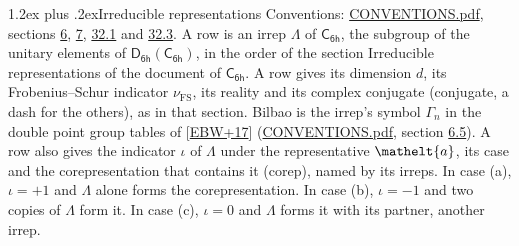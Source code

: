 \documentclass[10pt,a4paper]{article}
\makeatletter
\renewcommand\section{\@startsection{section}{1}{\z@}{-3ex plus -1ex minus -.2ex}%
  {1.2ex plus .2ex}{\normalfont\large\sffamily\bfseries\color{parttitle}}}
\numberwithin{equation}{section}
\newcommand{\eltfont}[1]{{\let\sigma\eltsigma\mathelt{#1}}}
\newcommand{\grp}[1]{\mathsf{#1}}
\newcommand{\elt}[1]{\eltfont{#1}}
\newcommand{\fsind}{\nu_{\mathrm{FS}}}
\makeatother
\begin{document}
\section{Irreducible representations}\label{s:irreps}
Conventions: \href{../../CONVENTIONS.pdf}{CONVENTIONS.pdf}, sections \href{../../../rotation/CONVENTIONS.pdf\#conv.6}{6}, \href{../../../rotation/CONVENTIONS.pdf\#conv.7}{7}, \href{../../CONVENTIONS.pdf\#conv.32.1}{32.1} and \href{../../CONVENTIONS.pdf\#conv.32.3}{32.3}.
\leavevmode\label{n:irrep.Delta}A row is an irrep $\Lambda$ of $\grp{C_{6h}}$, the subgroup of the unitary elements of $\grp{D_{6h}}(\grp{C_{6h}})$, in the order of the section Irreducible representations of the document of \href{../../../rotation/data/pdf/C6h.pdf}{$\grp{C_{6h}}$}. \label{n:index.dimension}\label{n:index.frobenius}\label{n:head.irrep}\label{n:head.reality}\label{n:head.conjugate}A row gives its dimension $d$, its Frobenius--Schur indicator $\fsind$, its reality and its complex conjugate (conjugate, a dash for the others), as in that section. \label{n:head.bilbao}\label{n:irrep.alias.gamma}Bilbao is the irrep's symbol $\Gamma_n$ in the double point group tables of [\href{../../../REFERENCES.pdf\#ref.EBW+17}{EBW+17}] (\href{../../CONVENTIONS.pdf}{CONVENTIONS.pdf}, section \href{../../../rotation/CONVENTIONS.pdf\#conv.6.5}{6.5}). \label{n:head.case.corep}\label{n:head.corep}A row also gives the indicator $\iota$ of $\Lambda$ under the representative $\elt{a}$, its case and the corepresentation that contains it (corep), named by its irreps. In case (a), $\iota = +1$ and $\Lambda$ alone forms the corepresentation. In case (b), $\iota = -1$ and two copies of $\Lambda$ form it. In case (c), $\iota = 0$ and $\Lambda$ forms it with its partner, another irrep.
\setlength{\emergencystretch}{2em}\par\setlength{\emergencystretch}{0pt}
\end{document}
